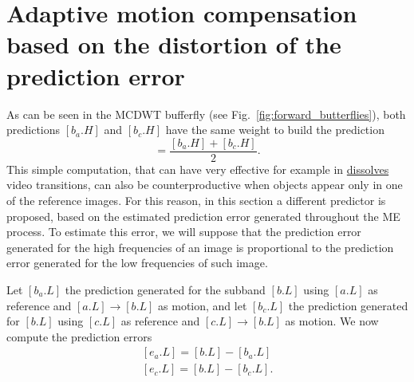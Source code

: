 


\section{Adaptive motion compensation based on the distortion of the prediction error}

As can be seen in the MCDWT bufferfly (see
Fig.~\ref{fig:forward_butterflies}), both predictions $[b_a.H]$ and
$[b_c.H]$ have the same weight to build the prediction
\begin{equation}
  [\hat{b.H}] = \frac{[b_a.H] + [b_c.H]}{2}.
\end{equation}
This simple computation, that can have very effective for example in
\href{https://biteable.com/blog/tips/video-transitions-effects-examples/}{dissolves}
video transitions, can also be counterproductive when objects appear
only in one of the reference images. For this reason, in this section
a different predictor is proposed, based on the estimated prediction
error generated throughout the ME process. To estimate this error, we
will suppose that the prediction error generated for the high
frequencies of an image is proportional to the prediction error
generated for the low frequencies of such image.

Let $[b_a.L]$ the prediction generated for the subband $[b.L]$ using
$[a.L]$ as reference and $[a.L]\rightarrow [b.L]$ as motion, and let
$[b_c.L]$ the prediction generated for $[b.L]$ using $[c.L]$ as
reference and $[c.L]\rightarrow [b.L]$ as motion. We now compute the
prediction errors
\begin{equation}
  \begin{array}{l}
    {[e_a.L]} = [b.L] - [b_a.L]\\
    {[e_c.L]} = [b.L] - [b_c.L].
  \end{array}
\end{equation}


